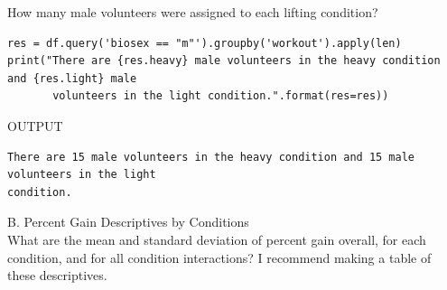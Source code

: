 \documentclass[onecolumn,10pt]{jhwhw}
\begin{document}
\noindent How many male volunteers were assigned to each lifting condition?
\begin{lstlisting}
res = df.query('biosex == "m"').groupby('workout').apply(len)
print("There are {res.heavy} male volunteers in the heavy condition and {res.light} male
       volunteers in the light condition.".format(res=res))
\end{lstlisting}
\noindent OUTPUT
\begin{lstlisting}[language={}]
There are 15 male volunteers in the heavy condition and 15 male volunteers in the light
condition.
\end{lstlisting}
\vspace{1em}
B. Percent Gain Descriptives by Conditions\\
\noindent What are the mean and standard deviation of percent gain overall, for each condition, and for all condition interactions? I recommend making a table of these descriptives.
\end{document}
